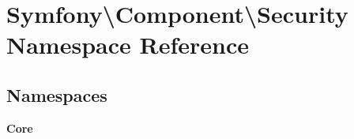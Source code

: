 \section{Symfony\textbackslash{}Component\textbackslash{}Security Namespace Reference}
\label{namespace_symfony_1_1_component_1_1_security}
\subsection*{Namespaces}
\begin{DoxyCompactItemize}
\item 
 {\bf Core}
\end{DoxyCompactItemize}
